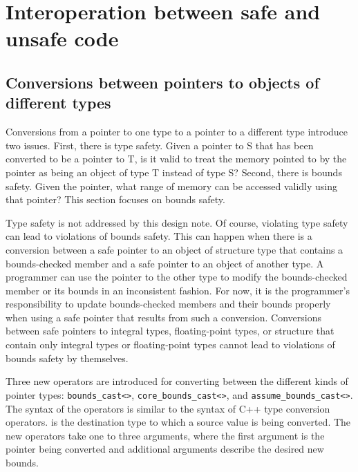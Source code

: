 
\newcommand{\boundscast}[2]{\texttt{bounds\_cast<#1>#2}}
\newcommand{\coreboundscast}[2]{\texttt{core\_bounds\_cast<#1>#2}}
\newcommand{\assumeboundscast}[2]{\texttt{assume\_bounds\_cast<#1>#2}}
\newcommand{\ptrcast}[2]{\texttt{bounds\_cast<#1>#2}}

\chapter{Interoperation between safe and unsafe code}
\label{chapter:interoperation}

\section{Conversions between pointers to objects of different types}
\label{section:pointer-casting}

Conversions from a pointer to one type to a pointer to a different type
introduce two issues. First, there is type safety. Given a pointer to S
that has been converted to be a pointer to T, is it valid to treat the
memory pointed to by the pointer as being an object of type T instead of
type S? Second, there is bounds safety. Given the pointer, what range of
memory can be accessed validly using that pointer? This section focuses on
bounds safety.

Type safety is not addressed by this design note. Of course, violating
type safety can lead to violations of bounds safety. This can happen
when there is a conversion between a safe pointer to an object of
structure type that contains a bounds-checked member and a safe pointer
to an object of another type. A programmer can use the pointer to the
other type to modify the bounds-checked member or its bounds in an
inconsistent fashion. For now, it is the programmer's responsibility to
update bounds-checked members and their bounds properly when using a
safe pointer that results from such a conversion. Conversions between
safe pointers to integral types, floating-point types, or structure that
contain only integral types or floating-point types cannot lead to
violations of bounds safety by themselves.

Three new operators are introduced for converting between the different
kinds of pointer types:
\boundscast{}{},
\coreboundscast{}{},
and \assumeboundscast{\var{T}}{}.
The syntax of the operators is similar to the syntax of C++ type
conversion operators.  is the destination type to which a source
value is being converted. The new operators take one to three arguments,
where the first argument is the pointer being converted and additional
arguments describe the desired new bounds.

